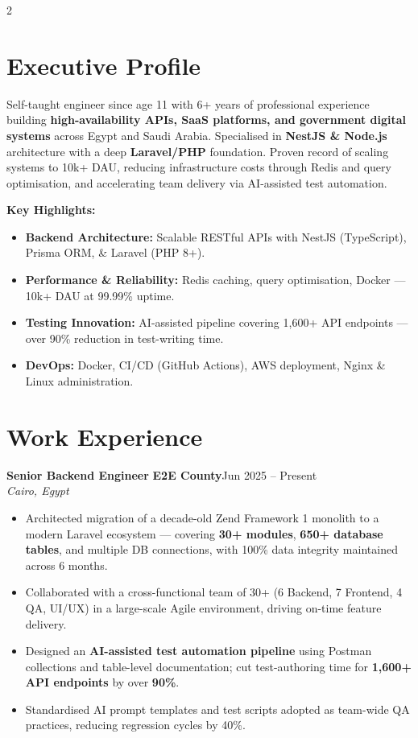 \documentclass[10pt, a4paper]{article}
\newcommand{\job}[4]{%
  \vspace{5pt}%
  {\bfseries\color{Dark}#1}\enspace{\color{Light}|}\enspace%
  {\bfseries\color{Blue}#2}\hfill{\footnotesize\color{Light}#3}\\%
  {\small\itshape\color{Light}#4}\vspace{2pt}%
}
\newcommand{\bitem}[1]{%
  \item\small{\color{Mid}#1}%
}
\newenvironment{blist}{%
  \begin{itemize}[leftmargin=0.18in, itemsep=1pt, topsep=1pt, parsep=0pt]%
}{%
  \end{itemize}%
}
\begin{document}
\begin{paracol}{2}


\section{Executive Profile}

{\small\color{Mid}
Self-taught engineer since age 11 with 6+ years of professional experience building
\textbf{high-availability APIs, SaaS platforms, and government digital systems} across Egypt and Saudi Arabia.
Specialised in \textbf{NestJS \& Node.js} architecture with a deep \textbf{Laravel/PHP} foundation.
Proven record of scaling systems to 10k+ DAU, reducing infrastructure costs through Redis and query optimisation,
and accelerating team delivery via AI-assisted test automation.}

\vspace{5pt}
{\small\bfseries\color{Dark}Key Highlights:}
\begin{blist}
  \bitem{\textbf{Backend Architecture:} Scalable RESTful APIs with NestJS (TypeScript), Prisma ORM, \& Laravel (PHP 8+).}
  \bitem{\textbf{Performance \& Reliability:} Redis caching, query optimisation, Docker — 10k+ DAU at 99.99\% uptime.}
  \bitem{\textbf{Testing Innovation:} AI-assisted pipeline covering 1,600+ API endpoints — over 90\% reduction in test-writing time.}
  \bitem{\textbf{DevOps:} Docker, CI/CD (GitHub Actions), AWS deployment, Nginx \& Linux administration.}
\end{blist}

\section{Work Experience}

\job{Senior Backend Engineer}{E2E County}{Jun 2025 – Present}{Cairo, Egypt}
\begin{blist}
  \bitem{Architected migration of a decade-old Zend Framework 1 monolith to a modern Laravel ecosystem — covering \textbf{30+ modules}, \textbf{650+ database tables}, and multiple DB connections, with 100\% data integrity maintained across 6 months.}
  \bitem{Collaborated with a cross-functional team of 30+ (6 Backend, 7 Frontend, 4 QA, UI/UX) in a large-scale Agile environment, driving on-time feature delivery.}
  \bitem{Designed an \textbf{AI-assisted test automation pipeline} using Postman collections and table-level documentation; cut test-authoring time for \textbf{1,600+ API endpoints} by over \textbf{90\%}.}
  \bitem{Standardised AI prompt templates and test scripts adopted as team-wide QA practices, reducing regression cycles by 40\%.}
\end{blist}


\end{paracol}
\end{document}
